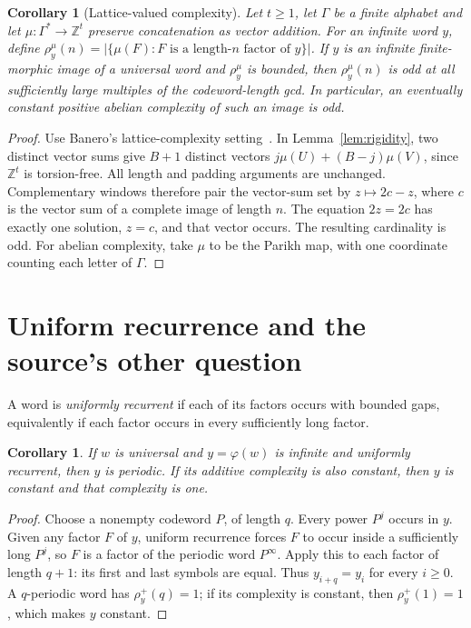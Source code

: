 \documentclass[11pt]{article}
\newtheorem{corollary}[theorem]{Corollary}
\newcommand{\Z}{\mathbb Z}
\begin{document}
\begin{corollary}[Lattice-valued complexity]\label{cor:lattice}
Let $t\geq1$, let $\Gamma$ be a finite alphabet and let
$\mu:\Gamma^*\to\Z^t$ preserve concatenation as vector addition.
For an infinite word $y$, define
$\rho_y^\mu(n)=|\{\mu(F): F\text{ is a length-}n\text{ factor of }y\}|$.
If $y$ is an infinite finite-morphic image of a universal word and
$\rho_y^\mu$ is bounded, then $\rho_y^\mu(n)$ is odd at all sufficiently
large multiples of the codeword-length gcd. In particular, an eventually
constant positive abelian complexity of such an image is odd.
\end{corollary}
\begin{proof}
Use Banero's lattice-complexity setting~\cite[Definition~34]{banero}.
In Lemma~\ref{lem:rigidity}, two distinct vector sums give $B+1$
distinct vectors $j\mu(U)+(B-j)\mu(V)$, since $\Z^t$ is torsion-free.
All length and padding arguments are unchanged. Complementary windows
therefore pair the vector-sum set by $z\mapsto2c-z$, where $c$ is the
vector sum of a complete image of length $n$. The equation $2z=2c$
has exactly one solution, $z=c$, and that vector occurs. The resulting
cardinality is odd. For abelian complexity, take $\mu$ to be the Parikh
map, with one coordinate counting each letter of $\Gamma$.
\end{proof}

\section{Uniform recurrence and the source's other question}
A word is \emph{uniformly recurrent} if each of its factors occurs with
bounded gaps, equivalently if each factor occurs in every sufficiently
long factor.

\begin{corollary}\label{cor:recurrence}
If $w$ is universal and $y=\varphi(w)$ is infinite and uniformly
recurrent, then $y$ is periodic. If its additive complexity is also
constant, then $y$ is constant and that complexity is one.
\end{corollary}
\begin{proof}
Choose a nonempty codeword $P$, of length $q$. Every power $P^j$ occurs
in $y$. Given any factor $F$ of $y$, uniform recurrence forces $F$ to
occur inside a sufficiently long $P^j$, so $F$ is a factor of the
periodic word $P^{\infty}$. Apply this to each factor of length $q+1$:
its first and last symbols are equal. Thus $y_{i+q}=y_i$ for every
$i\geq0$. A $q$-periodic word has $\rho_y^+(q)=1$; if its complexity
is constant, then $\rho_y^+(1)=1$, which makes $y$ constant.
\end{proof}
\end{document}
